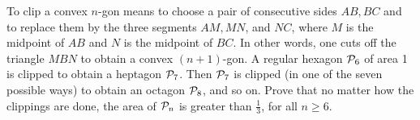 To clip a convex $n$-gon means to choose a pair of consecutive sides $AB, BC$ and to replace them by the three segments $AM, MN$,  and $NC$,  where $M$ is the midpoint of $AB$ and $N$ is the midpoint of $BC$.  In other words, one cuts off the triangle $MBN$ to obtain a convex $(n+1)$-gon.  A regular hexagon ${\cal P}_6$ of area 1 is clipped to obtain a heptagon ${\cal P}_7$.  Then ${\cal P}_7$ is clipped (in one of the seven possible ways) to obtain an octagon ${\cal P}_8$,  and so on.  Prove that no matter how the clippings are done, the area of ${\cal P}_n$ is greater than $\frac 13$,  for all $n \geq 6$.